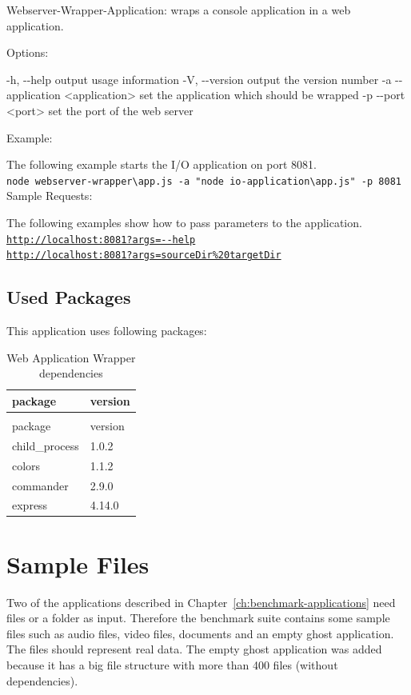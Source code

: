 	  Webserver-Wrapper-Application: wraps a console application in a web application.
	
	  Options:
	
	    -h, -{}-help                      output usage information\newline
	    -V, -{}-version                   output the version number\newline
	    -a -{}-application <application>  set the application which should be wrapped\newline
	    -p -{}-port <port>                set the port of the web server
	\par
	\endgroup
	
	Example: 
	
	
	The following example starts the I/O application on port 8081. \\
	\texttt{node webserver-wrapper\textbackslash app.js -a "node io-application\textbackslash app.js" -p 8081} \\
	
	
	Sample Requests:

	The following examples show how to pass parameters to the application.\\
	\texttt{\url{http://localhost:8081?args=--help}} \\
	\texttt{\url{http://localhost:8081?args=sourceDir\%20targetDir}} \\ 
	
\subsection{Used Packages}
This application uses following packages:
\begin{longtable}{ll}
		\caption{Web Application Wrapper dependencies}\\
		package&version\\
		\hline
		\endfirsthead
		\caption[]{Web Application Wrapper dependencies}\\
		package&version\\
		\hline
		\endhead
		child\_process & 1.0.2 \\
		colors & 1.1.2 \\
		commander & 2.9.0 \\
		express & 4.14.0 \\
\end{longtable}

\section{Sample Files}
Two of the applications described in Chapter~\ref{ch:benchmark-applications} need files or a folder as input. Therefore the benchmark suite contains some sample files such as audio files, video files, documents and an empty ghost application. The files should represent real data. The empty ghost application was added because it has a big file structure with more than 400 files (without dependencies). 


